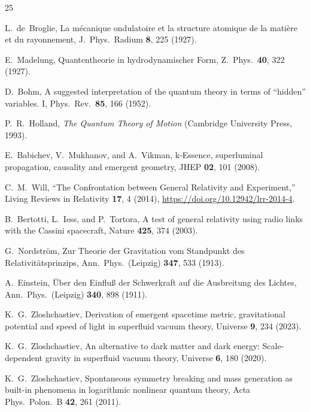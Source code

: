 \documentclass[12pt, a4paper]{article}
\begin{document}
\begin{thebibliography}{25}

L.~de~Broglie,
La m\'{e}canique ondulatoire et la structure atomique de la mati\`{e}re et du rayonnement,
J.\ Phys.\ Radium \textbf{8}, 225 (1927).

E.~Madelung,
Quantentheorie in hydrodynamischer Form,
Z.\ Phys.\ \textbf{40}, 322 (1927).

D.~Bohm,
A suggested interpretation of the quantum theory in terms of ``hidden'' variables. I,
Phys.\ Rev.\ \textbf{85}, 166 (1952).

P.~R.~Holland,
\emph{The Quantum Theory of Motion} (Cambridge University Press, 1993).

E.~Babichev, V.~Mukhanov, and A.~Vikman,
k-Essence, superluminal propagation, causality and emergent geometry,
JHEP \textbf{02}, 101 (2008).

C.~M.~Will,
``The Confrontation between General Relativity and Experiment,''
Living Reviews in Relativity \textbf{17}, 4 (2014),
\url{https://doi.org/10.12942/lrr-2014-4}.

B.~Bertotti, L.~Iess, and P.~Tortora,
A test of general relativity using radio links with the Cassini spacecraft,
Nature \textbf{425}, 374 (2003).

G.~Nordstr\"{o}m,
Zur Theorie der Gravitation vom Standpunkt des Relativit\"{a}tsprinzips,
Ann.\ Phys.\ (Leipzig) \textbf{347}, 533 (1913).

A.~Einstein,
\"{U}ber den Einflu\ss{} der Schwerkraft auf die Ausbreitung des Lichtes,
Ann.\ Phys.\ (Leipzig) \textbf{340}, 898 (1911).

K.~G.~Zloshchastiev,
Derivation of emergent spacetime metric, gravitational potential and speed of light in superfluid vacuum theory,
Universe \textbf{9}, 234 (2023).

K.~G.~Zloshchastiev,
An alternative to dark matter and dark energy: Scale-dependent gravity in superfluid vacuum theory,
Universe \textbf{6}, 180 (2020).

K.~G.~Zloshchastiev,
Spontaneous symmetry breaking and mass generation as built-in phenomena in logarithmic nonlinear quantum theory,
Acta Phys.\ Polon.\ B \textbf{42}, 261 (2011).


\end{thebibliography}
\end{document}
